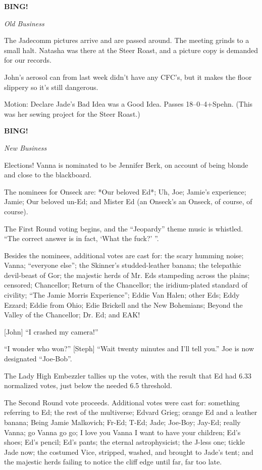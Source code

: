 \documentclass[12pt]{article}
\newcommand{\bing}{{\bf BING!} }
\newcommand{\goto}[1]{\bing \vskip 12pt \centerline{{\em{#1}}}}
\begin{document}
\goto{Old Business}

The Jadecomm pictures arrive and are passed around.  The meeting
grinds to a small halt.  Natasha was there at the Steer Roast, and
a picture copy is demanded for our records.

John's aerosol can from last week didn't have any CFC's, but it makes
the floor slippery so it's still dangerous.

Motion: Declare Jade's Bad Idea was a Good Idea.  Passes 18--0--4+Spehn.
(This was her sewing project for the Steer Roast.)

\goto{New Business}

Elections!  Vanna is nominated to be Jennifer Berk, on account of being
blonde and close to the blackboard.

The nominees for Onseck are: *Our beloved Ed*; Uh, Joe; Jamie's
experience; Jamie; Our beloved un-Ed; and Mister Ed (an Onseck's an Onseck,
of course, of course).

The First Round voting begins, and the ``Jeopardy'' theme music is
whistled.  ``The correct answer is in fact, `What the fuck?' ''.

Besides the nominees, additional votes are cast for: the scary humming
noise; Vanna; ``everyone else''; the Skinner's studded-leather banana;
the telepathic devil-beast of Gor; the majestic herds of Mr. Eds
stampeding across the plains; censored; Chancellor; Return of the
Chancellor; the iridium-plated standard of civility; ``The Jamie
Morris Experience''; Eddie Van Halen; other Eds; Eddy Ezzard; Eddie
from Ohio; Edie Brickell and the New Bohemians; Beyond the Valley of
the Chancellor; Dr. Ed; and EAK!

[John] ``I crashed my camera!''

``I wonder who won?''  [Steph] ``Wait twenty minutes and I'll tell
you.''  Joe is now designated ``Joe-Bob''.

The Lady High Embezzler tallies up the votes, with the result that
Ed had 6.33 normalized votes, just below the needed 6.5 threshold.

The Second Round vote proceeds.  Additional votes were cast for:
something referring to Ed; the rest of the multiverse; Edvard Grieg;
orange Ed and a leather banana; Being Jamie Malkovich; Fr-Ed; T-Ed;
Jade; Joe-Boy; Jay-Ed; really Vanna; go Vanna go go; I love you Vanna
I want to have your children; Ed's shoes; Ed's pencil; Ed's pants;
the eternal astrophysicist; the J-less one; tickle Jade now; the
costumed Vice, stripped, washed, and brought to Jade's tent; and the
majestic herds failing to notice the cliff edge until far, far too
late.
\end{document}
